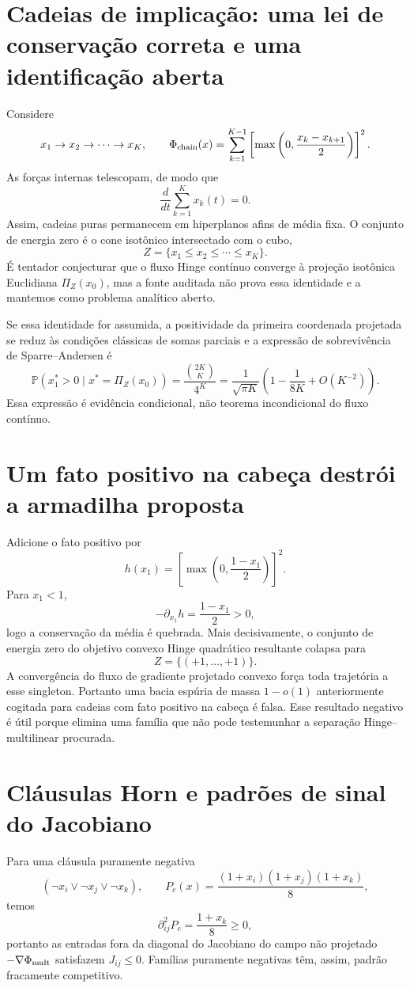 \documentclass[11pt,a4paper]{article}
\begin{document}
\section{Cadeias de implicação: uma lei de conservação correta e uma identificação aberta}
Considere
\[
x_1\to x_2\to\cdots\to x_K,
\qquad
\Phi_{\rm chain}(x)=\sum_{k=1}^{K-1}\left[\max\left(0,\frac{x_k-x_{k+1}}2\right)\right]^2.
\]
As forças internas telescopam, de modo que
\begin{equation}
\frac{d}{dt}\sum_{k=1}^Kx_k(t)=0.
\end{equation}
Assim, cadeias puras permanecem em hiperplanos afins de média fixa. O conjunto de energia zero é o cone isotônico intersectado com o cubo,
\[
Z=\{x_1\le x_2\le\cdots\le x_K\}.
\]
É tentador conjecturar que o fluxo Hinge contínuo converge à projeção isotônica Euclidiana $\Pi_Z(x_0)$, mas a fonte auditada não prova essa identidade e a mantemos como problema analítico aberto.

Se essa identidade for assumida, a positividade da primeira coordenada projetada se reduz às condições clássicas de somas parciais e a expressão de sobrevivência de Sparre--Andersen é
\begin{equation}
\mathbb P(x_1^*>0\mid x^*=\Pi_Z(x_0))=\frac{\binom{2K}{K}}{4^K}=\frac1{\sqrt{\pi K}}\left(1-\frac1{8K}+O(K^{-2})\right).
\end{equation}
Essa expressão é evidência condicional, não teorema incondicional do fluxo contínuo.

\section{Um fato positivo na cabeça destrói a armadilha proposta}
Adicione o fato positivo por
\[
h(x_1)=\left[\max\left(0,\frac{1-x_1}{2}\right)\right]^2.
\]
Para $x_1<1$,
\[
-\partial_{x_1}h=\frac{1-x_1}{2}>0,
\]
logo a conservação da média é quebrada. Mais decisivamente, o conjunto de energia zero do objetivo convexo Hinge quadrático resultante colapsa para
\[
Z=\{(+1,\ldots,+1)\}.
\]
A convergência do fluxo de gradiente projetado convexo força toda trajetória a esse singleton. Portanto uma bacia espúria de massa $1-o(1)$ anteriormente cogitada para cadeias com fato positivo na cabeça é falsa. Esse resultado negativo é útil porque elimina uma família que não pode testemunhar a separação Hinge--multilinear procurada.

\section{Cláusulas Horn e padrões de sinal do Jacobiano}
Para uma cláusula puramente negativa
\[
(\neg x_i\lor\neg x_j\lor\neg x_k),\qquad P_c(x)=\frac{(1+x_i)(1+x_j)(1+x_k)}8,
\]
temos
\[
\partial_{ij}^2P_c=\frac{1+x_k}{8}\ge0,
\]
portanto as entradas fora da diagonal do Jacobiano do campo não projetado $-\nabla\Phi_{\rm mult}$ satisfazem $J_{ij}\le0$. Famílias puramente negativas têm, assim, padrão fracamente competitivo.
\end{document}
